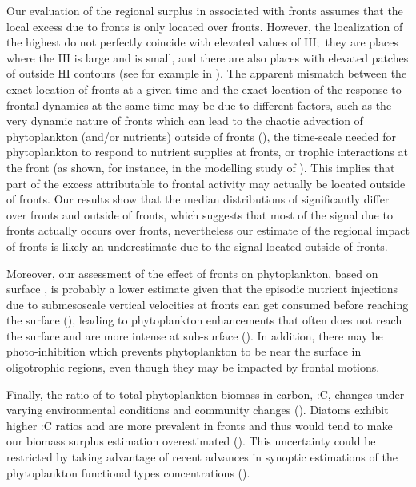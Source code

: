 Our evaluation of the regional surplus in  associated with fronts assumes that the local  excess due to fronts is only located over fronts.
However, the localization of the highest  do not perfectly coincide with elevated values of HI;\ they are places where the HI is large and  is small, and there are also places with elevated patches of  outside HI contours (see for example in ).
The apparent mismatch between the exact location of fronts at a given time and the exact location of the  response to frontal dynamics at the same time may be due to different factors, such as the very dynamic nature of fronts which can lead to the chaotic advection of phytoplankton (and/or nutrients) outside of fronts (\cite{abraham_1998}), the time-scale needed for phytoplankton to respond to nutrient supplies at fronts, or trophic interactions at the front (as shown, for instance, in the modelling study of \textcite{mangolte_2022}).
This implies that part of the excess  attributable to frontal activity may actually be located outside of fronts. Our results show that the median distributions of  significantly differ over fronts and outside of fronts, which suggests that most of the signal due to fronts actually occurs over fronts, nevertheless our estimate of the regional impact of fronts is likely an underestimate due to the signal located outside of fronts.

Moreover, our assessment of the effect of fronts on phytoplankton, based on surface , is probably a lower estimate given that the episodic nutrient injections due to submesoscale vertical velocities at fronts can get consumed before reaching the surface (\cite{johnson_2010}), leading to phytoplankton enhancements that often does not reach the surface and are more intense at sub-surface (\cite{mourino_2004, ruiz_2019}).
In addition, there may be photo-inhibition which prevents phytoplankton to be near the surface in oligotrophic regions, even though they may be impacted by frontal motions.

Finally, the ratio of  to total phytoplankton biomass in carbon, \hbox{:C}, changes under varying environmental conditions and community changes (\cite{behrenfeld_2015, halsey_2015, inomura_2022}).
Diatoms exhibit higher \hbox{:C} ratios and are more prevalent in fronts and thus would tend to make our biomass surplus estimation overestimated (\cite{treguer_2018}).
This uncertainty could be restricted by taking advantage of recent advances in synoptic estimations of the phytoplankton functional types concentrations (\cite{elhourany_2019}).

